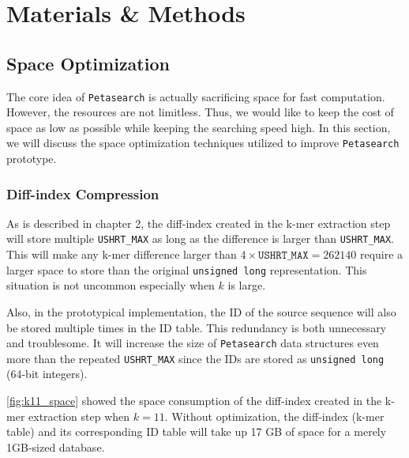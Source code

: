 \chapter{Materials \& Methods} \label{chapter:materials-methods}



\section{Space Optimization}

The core idea of \texttt{Petasearch} is actually sacrificing space for fast computation. However, the resources are not limitless. Thus, we would like to keep the cost of space as low as possible while keeping the searching speed high. In this section, we will discuss the space optimization techniques utilized to improve \texttt{Petasearch} prototype.

\subsection{Diff-index Compression} \label{section:diff-index_compression}

As is described in chapter 2, the diff-index created in the k-mer extraction step will store multiple \texttt{USHRT\_MAX} as long as the difference is larger than \texttt{USHRT\_MAX}. This will make any k-mer difference larger than $4 \times \mathtt{USHRT\_MAX} = 262140$ require a larger space to store than the original \texttt{unsigned long} representation. This situation is not uncommon especially when $k$ is large.

Also, in the prototypical implementation, the ID of the source sequence will also be stored multiple times in the ID table. This redundancy is both unnecessary and troublesome. It will increase the size of \texttt{Petasearch} data structures even more than the repeated \texttt{USHRT\_MAX} since the IDs are stored as \texttt{unsigned long} (64-bit integers).


\autoref{fig:k11_space} showed the space consumption of the diff-index created in the k-mer extraction step when $k = 11$. Without optimization, the diff-index (k-mer table) and its corresponding ID table will take up 17 GB of space for a merely 1GB-sized database.

